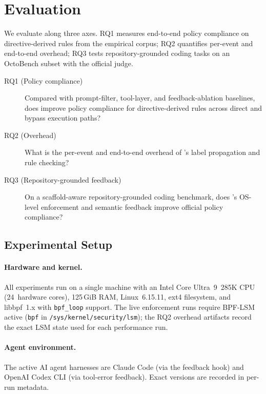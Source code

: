 \section{Evaluation}
\label{sec:evaluation}

We evaluate \sys{} along three axes. RQ1 measures end-to-end policy
compliance on directive-derived rules from the empirical corpus;
RQ2 quantifies per-event and end-to-end overhead; RQ3 tests
repository-grounded coding tasks on an OctoBench subset with the official
judge.

\begin{description}
\item[RQ1 (Policy compliance)] Compared with prompt-filter, tool-layer,
  and feedback-ablation baselines, does \sys{} improve policy
  compliance for directive-derived rules across direct and bypass
  execution paths?
\item[RQ2 (Overhead)] What is the per-event and end-to-end overhead of
  \sys{}'s label propagation and rule checking?
\item[RQ3 (Repository-grounded feedback)] On a scaffold-aware
  repository-grounded coding benchmark, does \sys{}'s OS-level
  enforcement and semantic feedback improve official policy compliance?
\end{description}

\subsection{Experimental Setup}
\label{sec:eval:setup}

\paragraph{Hardware and kernel.}
All experiments run on a single machine with an Intel Core Ultra~9~285K
CPU (24~hardware cores), 125\,GiB RAM, Linux~6.15.11, ext4 filesystem,
and libbpf~1.x with \texttt{bpf\_loop} support. The live enforcement
runs require BPF-LSM active (\texttt{bpf} in
\texttt{/sys/kernel/security/lsm}); the RQ2 overhead artifacts record
the exact LSM state used for each performance run.

\paragraph{Agent environment.}
The active AI agent harnesses are Claude Code (via the \sys{} feedback
hook) and OpenAI Codex CLI (via tool-error feedback). Exact versions are
recorded in per-run metadata.

